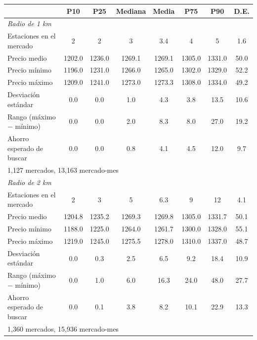 \begin{tabular}{lccccccc}
\toprule
 & P10 & P25 & Mediana & Media & P75 & P90 & D.E. \\
\midrule
\multicolumn{8}{l}{\emph{Radio de 1 km}} \\
Estaciones en el mercado & 2 & 2 & 3 & 3.4 & 4 & 5 & 1.6 \\
Precio medio & 1202.0 & 1236.0 & 1269.1 & 1269.1 & 1305.0 & 1331.0 & 50.0 \\
Precio mínimo & 1196.0 & 1231.0 & 1266.0 & 1265.0 & 1302.0 & 1329.0 & 52.2 \\
Precio máximo & 1209.0 & 1241.0 & 1273.0 & 1273.3 & 1308.0 & 1334.0 & 49.2 \\
Desviación estándar & 0.0 & 0.0 & 1.0 & 4.3 & 3.8 & 13.5 & 10.6 \\
Rango (máximo $-$ mínimo) & 0.0 & 0.0 & 2.0 & 8.3 & 8.0 & 27.0 & 19.2 \\
Ahorro esperado de buscar & 0.0 & 0.0 & 0.8 & 4.1 & 4.5 & 12.0 & 9.7 \\
\multicolumn{8}{l}{\footnotesize 1,127 mercados, 13,163 mercado-mes} \\
\midrule
\multicolumn{8}{l}{\emph{Radio de 2 km}} \\
Estaciones en el mercado & 2 & 3 & 5 & 6.3 & 9 & 12 & 4.1 \\
Precio medio & 1204.8 & 1235.2 & 1269.3 & 1269.8 & 1305.0 & 1331.7 & 50.1 \\
Precio mínimo & 1188.0 & 1225.0 & 1264.0 & 1261.7 & 1300.0 & 1328.0 & 55.1 \\
Precio máximo & 1219.0 & 1245.0 & 1275.5 & 1278.0 & 1310.0 & 1337.0 & 48.7 \\
Desviación estándar & 0.0 & 0.3 & 2.5 & 6.5 & 9.2 & 18.4 & 10.9 \\
Rango (máximo $-$ mínimo) & 0.0 & 1.0 & 6.0 & 16.3 & 24.0 & 48.0 & 27.7 \\
Ahorro esperado de buscar & 0.0 & 0.1 & 3.8 & 8.2 & 10.1 & 22.9 & 13.3 \\
\multicolumn{8}{l}{\footnotesize 1,360 mercados, 15,936 mercado-mes} \\
\bottomrule
\end{tabular}
